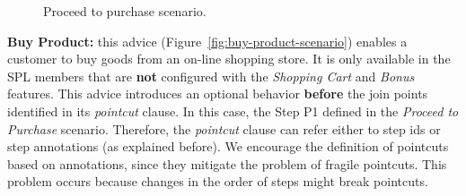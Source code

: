 \begin{figure}[h]
\caption{Proceed to purchase scenario.}
\label{fig:proceed-to-checkout}
\end{figure}

{\bf Buy Product:} this advice (Figure~\ref{fig:buy-product-scenario}) enables a
customer to buy goods from an on-line shopping store. It is only
available in the SPL members that are {\bf not} configured with the
\emph{Shopping Cart} and \emph{Bonus} features. This advice
introduces an optional behavior {\bf before} the join points identified in its
\emph{pointcut} clause. In this case, the Step P1 defined in the \emph{Proceed to
Purchase} scenario. Therefore, the \emph{pointcut} clause can refer either to step ids or
step annotations (as explained before). We encourage the definition of
pointcuts based on annotations, since they mitigate the problem
of fragile pointcuts. This problem occurs because changes in the order of
steps might break pointcuts.
 
